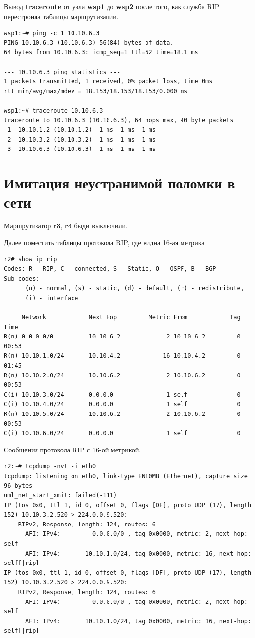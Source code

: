 \documentclass[a4paper,12pt]{article}
\begin{document}
Вывод \textbf{traceroute} от узла \textbf{wsp1} до \textbf{wsp2} после того, как служба RIP перестроила таблицы маршрутизации.

\begin{Verbatim}
wsp1:~# ping -c 1 10.10.6.3
PING 10.10.6.3 (10.10.6.3) 56(84) bytes of data.
64 bytes from 10.10.6.3: icmp_seq=1 ttl=62 time=18.1 ms

--- 10.10.6.3 ping statistics ---
1 packets transmitted, 1 received, 0% packet loss, time 0ms
rtt min/avg/max/mdev = 18.153/18.153/18.153/0.000 ms

wsp1:~# traceroute 10.10.6.3
traceroute to 10.10.6.3 (10.10.6.3), 64 hops max, 40 byte packets
 1  10.10.1.2 (10.10.1.2)  1 ms  1 ms  1 ms
 2  10.10.3.2 (10.10.3.2)  1 ms  1 ms  1 ms
 3  10.10.6.3 (10.10.6.3)  1 ms  1 ms  1 ms
\end{Verbatim}

\section{Имитация неустранимой поломки в сети}

Маршрутизатор \textbf{r3}, \textbf{r4} быди выключили.

Далее поместить таблицы протокола RIP, где видна 16-ая метрика

\begin{Verbatim}
r2# show ip rip
Codes: R - RIP, C - connected, S - Static, O - OSPF, B - BGP
Sub-codes:
      (n) - normal, (s) - static, (d) - default, (r) - redistribute,
      (i) - interface

     Network            Next Hop         Metric From            Tag Time
R(n) 0.0.0.0/0          10.10.6.2             2 10.10.6.2         0 00:53
R(n) 10.10.1.0/24       10.10.4.2            16 10.10.4.2         0 01:45
R(n) 10.10.2.0/24       10.10.6.2             2 10.10.6.2         0 00:53
C(i) 10.10.3.0/24       0.0.0.0               1 self              0
C(i) 10.10.4.0/24       0.0.0.0               1 self              0
R(n) 10.10.5.0/24       10.10.6.2             2 10.10.6.2         0 00:53
C(i) 10.10.6.0/24       0.0.0.0               1 self              0
\end{Verbatim}

Сообщения протокола RIP с 16-ой метрикой.

\begin{Verbatim}
r2:~# tcpdump -nvt -i eth0
tcpdump: listening on eth0, link-type EN10MB (Ethernet), capture size 96 bytes
uml_net_start_xmit: failed(-111)
IP (tos 0x0, ttl 1, id 0, offset 0, flags [DF], proto UDP (17), length 152) 10.10.3.2.520 > 224.0.0.9.520: 
	RIPv2, Response, length: 124, routes: 6
	  AFI: IPv4:         0.0.0.0/0 , tag 0x0000, metric: 2, next-hop: self
	  AFI: IPv4:       10.10.1.0/24, tag 0x0000, metric: 16, next-hop: self[|rip]
IP (tos 0x0, ttl 1, id 0, offset 0, flags [DF], proto UDP (17), length 152) 10.10.3.2.520 > 224.0.0.9.520: 
	RIPv2, Response, length: 124, routes: 6
	  AFI: IPv4:         0.0.0.0/0 , tag 0x0000, metric: 2, next-hop: self
	  AFI: IPv4:       10.10.1.0/24, tag 0x0000, metric: 16, next-hop: self[|rip]
\end{Verbatim}
\end{document}
